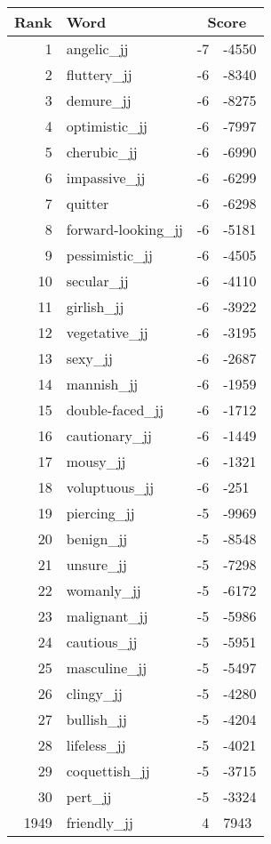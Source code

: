 \begin{longtable}[!htbp]{| rlr@{.}l |}
    \hline
    \textbf{Rank} & \textbf{Word} & \multicolumn{2}{c|}{\textbf{Score}} \\
    \hline
    \endhead
    1 & angelic\_jj & -7 & -4550 \\
    2 & fluttery\_jj & -6 & -8340 \\
    3 & demure\_jj & -6 & -8275 \\
    4 & optimistic\_jj & -6 & -7997 \\
    5 & cherubic\_jj & -6 & -6990 \\
    6 & impassive\_jj & -6 & -6299 \\
    7 & quitter & -6 & -6298 \\
    8 & forward-looking\_jj & -6 & -5181 \\
    9 & pessimistic\_jj & -6 & -4505 \\
    10 & secular\_jj & -6 & -4110 \\
    11 & girlish\_jj & -6 & -3922 \\
    12 & vegetative\_jj & -6 & -3195 \\
    13 & sexy\_jj & -6 & -2687 \\
    14 & mannish\_jj & -6 & -1959 \\
    15 & double-faced\_jj & -6 & -1712 \\
    16 & cautionary\_jj & -6 & -1449 \\
    17 & mousy\_jj & -6 & -1321 \\
    18 & voluptuous\_jj & -6 & -251 \\
    19 & piercing\_jj & -5 & -9969 \\
    20 & benign\_jj & -5 & -8548 \\
    21 & unsure\_jj & -5 & -7298 \\
    22 & womanly\_jj & -5 & -6172 \\
    23 & malignant\_jj & -5 & -5986 \\
    24 & cautious\_jj & -5 & -5951 \\
    25 & masculine\_jj & -5 & -5497 \\
    26 & clingy\_jj & -5 & -4280 \\
    27 & bullish\_jj & -5 & -4204 \\
    28 & lifeless\_jj & -5 & -4021 \\
    29 & coquettish\_jj & -5 & -3715 \\
    30 & pert\_jj & -5 & -3324 \\
    1949 & friendly\_jj & 4 & 7943 \\

\end{longtable}
